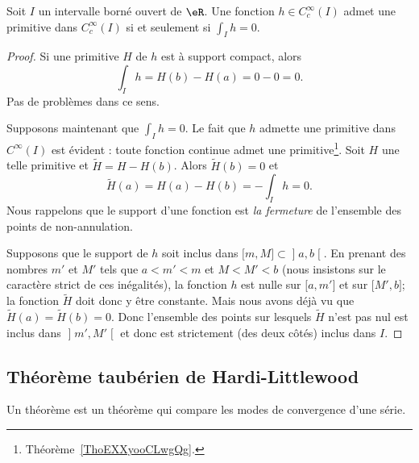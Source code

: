 \begin{proposition} \label{PropHFWNpRb}
    Soit \( I \) un intervalle borné ouvert de \( \eR\). Une fonction \( h\in C^{\infty}_c(I)\) admet une primitive dans \(  C^{\infty}_c(I)\) si et seulement si \( \int_Ih=0\).
\end{proposition}

\begin{proof}
    Si une primitive \( H\) de \( h\) est à support compact, alors
    \begin{equation}
        \int_Ih=H(b)-H(a)=0-0=0.
    \end{equation}
    Pas de problèmes dans ce sens.

    Supposons maintenant que \( \int_Ih=0\). Le fait que \( h\) admette une primitive dans \(  C^{\infty}(I)\) est évident : toute fonction continue admet une primitive\footnote{Théorème~\ref{ThoEXXyooCLwgQg}.}. Soit \( H\) une telle primitive et \( \tilde H=H-H(b)\). Alors \( \tilde H(b)=0\) et
    \begin{equation}
        \tilde H(a)=H(a)-H(b)=-\int_Ih=0.
    \end{equation}
    Nous rappelons que le support d'une fonction est \emph{la fermeture} de l'ensemble des points de non-annulation.

    Supposons que le support de \( h\) soit inclus dans \( \mathopen[ m , M \mathclose]\subset\mathopen] a , b \mathclose[\). En prenant des nombres \( m'\) et \( M'\) tels que \( a<m'<m\) et \( M<M'<b\) (nous insistons sur le caractère strict de ces inégalités), la fonction \( h\) est nulle sur \( \mathopen[ a , m' \mathclose]\) et sur \( \mathopen[ M' , b \mathclose]\); la fonction \( \tilde H\) doit donc y être constante. Mais nous avons déjà vu que \( \tilde H(a)=\tilde H(b)=0\). Donc l'ensemble des points sur lesquels \( \tilde H\) n'est pas nul est inclus dans \( \mathopen] m' , M' \mathclose[\) et donc est strictement (des deux côtés) inclus dans \( I\).
\end{proof}

\subsection{Théorème taubérien de Hardi-Littlewood}

Un théorème  est un théorème qui compare les modes de convergence d'une série.

